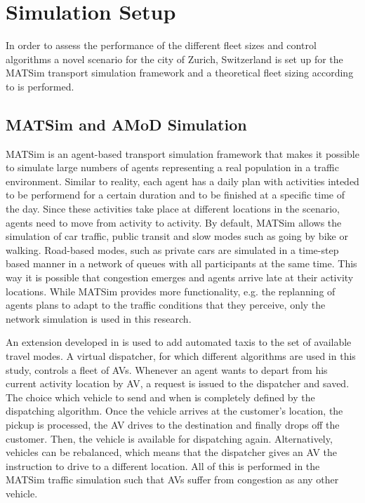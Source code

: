 \section{Simulation Setup}

In order to assess the performance of the different fleet sizes and control
algorithms a novel scenario for the city of Zurich, Switzerland is set up
for the MATSim transport simulation framework and a theoretical fleet sizing
according to \citep{spieser2014toward} is performed.


\subsection{MATSim and AMoD Simulation}

MATSim \citep{Horni2015} is an agent-based transport simulation framework that makes it possible
to simulate large numbers of agents representing a real population in a traffic environment. Similar to reality, each agent has a daily plan with activities
inteded to be performend for a certain duration and to be finished at a specific time of
the day. Since these activities take place at different locations in the scenario,
agents need to move from activity to activity. By default, MATSim allows the
simulation of car traffic, public transit and slow modes such as going by bike
or walking. Road-based modes, such as private cars are simulated in a time-step
based manner in a network of queues with all participants at the same time. This
way it is possible that congestion emerges and agents arrive late at their
activity locations. While MATSim provides more functionality, e.g. the replanning
of agents plans to adapt to the traffic conditions that they perceive, only the
network simulation is used in this research.

An extension developed in \cite{horl_abmtrans17} is used to add automated taxis to the set
of available travel modes. A virtual dispatcher, for which
different algorithms are used in this study, controls a fleet of AVs.
Whenever an agent wants to depart from his current activity location by
AV, a request is issued to the dispatcher and saved.  The choice which vehicle to send and when is completely defined
by the dispatching algorithm. Once the vehicle arrives at the customer's location,
the pickup is processed, the AV drives to the destination and finally drops off the customer. Then,
the vehicle is available for dispatching again. Alternatively, vehicles can be
rebalanced, which means that the dispatcher gives an AV the instruction
to drive to a different location. All of this is performed in the MATSim traffic
simulation such that AVs suffer from congestion as any other vehicle.

